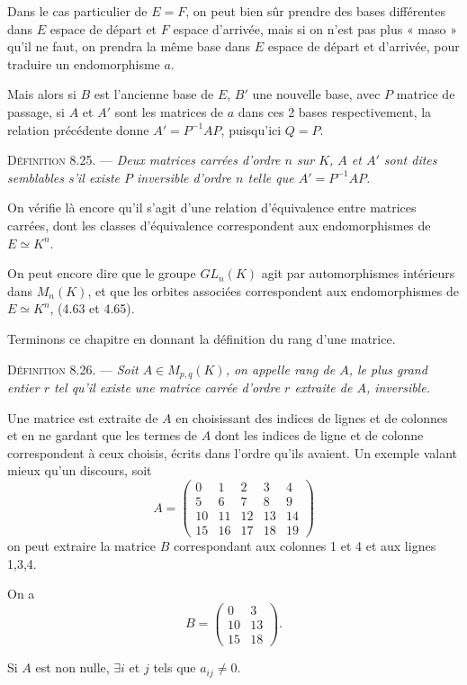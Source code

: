 Dans le cas particulier de $E=F$, on peut bien sûr prendre des bases différentes dans $E$ espace de départ et $F$ espace d'arrivée, mais si on n'est pas plus « maso » qu'il ne faut, on prendra la même base dans $E$ espace de départ et d'arrivée, pour traduire un endomorphisme $a$.

Mais alors si $B$ est l'ancienne base de $E$, $B'$ une nouvelle base, avec $P$ matrice de passage, si $A$ et $A'$ sont les matrices de $a$ dans ces 2 bases respectivement, la relation précédente donne $A'=P^{-1}AP$, puisqu'ici $Q=P$.

\medskip\noindent\textsc{Définition 8.25.} --- \emph{Deux matrices carrées d'ordre $n$ sur $K$, $A$ et $A'$ sont dites semblables s'il existe $P$ inversible d'ordre $n$ telle que $A'=P^{-1}AP$.}

On vérifie là encore qu'il s'agit d'une relation d'équivalence entre matrices carrées, dont les classes d'équivalence correspondent aux endomorphismes de $E\simeq K^n$.

On peut encore dire que le groupe $GL_n(K)$ agit par automorphismes intérieurs dans $M_n(K)$, et que les orbites associées correspondent aux endomorphismes de $E\simeq K^n$, (4.63 et 4.65).

Terminons ce chapitre en donnant la définition du rang d'une matrice.

\medskip\noindent\textsc{Définition 8.26.} --- \emph{Soit $A\in M_{p,q}(K)$, on appelle rang de $A$, le plus grand entier $r$ tel qu'il existe une matrice carrée d'ordre $r$ extraite de $A$, inversible.}

Une matrice est extraite de $A$ en choisissant des indices de lignes et de colonnes et en ne gardant que les termes de $A$ dont les indices de ligne et de colonne correspondent à ceux choisis, écrits dans l'ordre qu'ils avaient. Un exemple valant mieux qu'un discours, soit
\[
A=\begin{pmatrix}
0&1&2&3&4\\5&6&7&8&9\\10&11&12&13&14\\15&16&17&18&19
\end{pmatrix}
\]
on peut extraire la matrice $B$ correspondant aux colonnes 1 et 4 et aux lignes 1,3,4.

On a
\[
B=\begin{pmatrix}0&3\\10&13\\15&18\end{pmatrix}.
\]

Si $A$ est non nulle, $\exists i$ et $j$ tels que $a_{ij}\ne0$.

